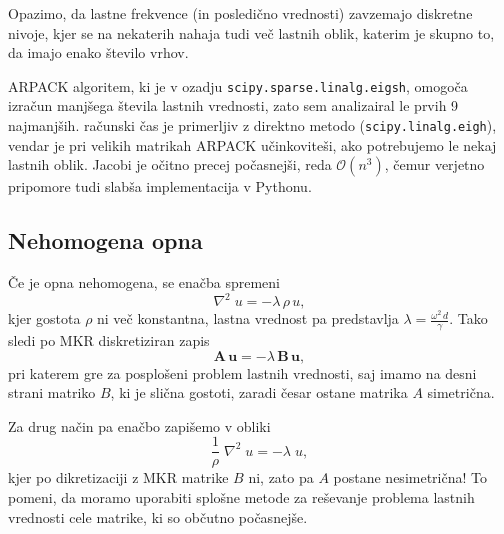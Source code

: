 
Opazimo, da lastne frekvence (in posledično vrednosti) zavzemajo diskretne nivoje, kjer se na nekaterih nahaja tudi več lastnih oblik, katerim je skupno to, da imajo enako število vrhov.

ARPACK algoritem, ki je v ozadju \texttt{scipy.sparse.linalg.eigsh}, omogoča izračun manjšega števila lastnih vrednosti, zato sem analizairal le prvih 9 najmanjših. računski čas je primerljiv z direktno metodo (\texttt{scipy.linalg.eigh}), vendar je pri velikih matrikah ARPACK učinkoviteši, ako potrebujemo le nekaj lastnih oblik. Jacobi je očitno precej počasnejši, reda $\mathcal{O}(n^3)$, čemur verjetno pripomore tudi slabša implementacija v Pythonu.


\subsection{Nehomogena opna}

Če je opna nehomogena, se enačba spremeni
\begin{equation}
    \nabla^2\;u = -\lambda\,\rho\,u,
\end{equation}
kjer gostota $\rho$ ni več konstantna, lastna vrednost pa predstavlja $\lambda = \frac{\omega^2\,d}{\gamma}$. Tako sledi po MKR diskretiziran zapis
\begin{equation}
    \mathbf{A}\,\mathbf{u} = -\lambda\,\mathbf{B}\,\mathbf{u},
\end{equation}
pri katerem gre za posplošeni problem lastnih vrednosti, saj imamo na desni strani matriko $B$, ki je slična gostoti, zaradi česar ostane matrika $A$ simetrična.

Za drug način pa enačbo zapišemo v obliki
\begin{equation}
    \frac{1}{\rho}\;\nabla^2\;u = -\lambda\;u,
\end{equation}
kjer po dikretizaciji z MKR matrike $B$ ni, zato pa $A$ postane nesimetrična! To pomeni, da moramo uporabiti splošne metode za reševanje problema lastnih vrednosti cele matrike, ki so občutno počasnejše.

